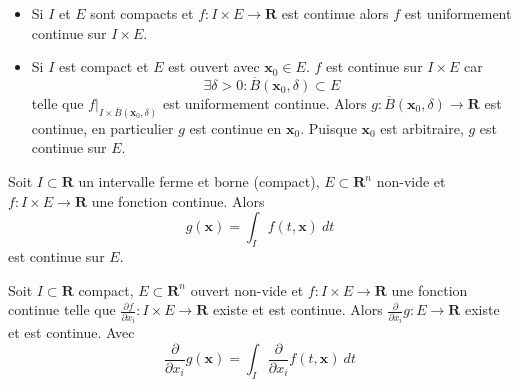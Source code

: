 \begin{itemize}
\item Si $I$ et $E$ sont compacts et $f:I\times E\to \mathbf{R}$ est continue alors $f$ est uniformement continue sur $I\times E$.
\item Si $I$ est compact et $E$ est ouvert avec $\boldsymbol{x}_{0}\in E$. $f$ est continue sur $I\times E$ car
$$
\exists\delta>0:\overline{B}(\boldsymbol{x}_{0},\delta)\subset E 
$$
telle que $f|_{I\times \overline{B}(\boldsymbol{x}_{0},\delta)}$ est uniformement continue. Alors $g:\overline{B}(\boldsymbol{x}_{0},\delta)\to \mathbf{R}$ est continue, en particulier $g$ est continue en $\boldsymbol{x}_{0}$. Puisque $\boldsymbol{x}_{0}$ est arbitraire, $g$ est continue sur $E$.
\end{itemize}
\begin{theorem}
Soit $I\subset \mathbf{R}$ un intervalle ferme et borne (compact), $E\subset \mathbf{R}^{n}$ non-vide et $f:I\times E\to \mathbf{R}$ une fonction continue. Alors
$$
g(\boldsymbol{x})=\int _{I}f(t,\boldsymbol{x})~dt
$$
est continue sur $E$.
\end{theorem}
\begin{theorem}
Soit $I\subset \mathbf{R}$ compact, $E\subset \mathbf{R}^{n}$ ouvert non-vide et $f:I\times E\to \mathbf{R}$ une fonction continue telle que $\frac{ \partial f }{ \partial x_{i} }:I\times E\to \mathbf{R}$ existe et est continue. Alors $\frac{ \partial  }{ \partial x_{i} }g:E\to \mathbf{R}$ existe et est continue. Avec
$$
\frac{ \partial  }{ \partial x_{i} } g(\boldsymbol{x})=\int _{I} \frac{ \partial  }{ \partial x_{i} } f(t,\boldsymbol{x})~dt
$$
\end{theorem}

